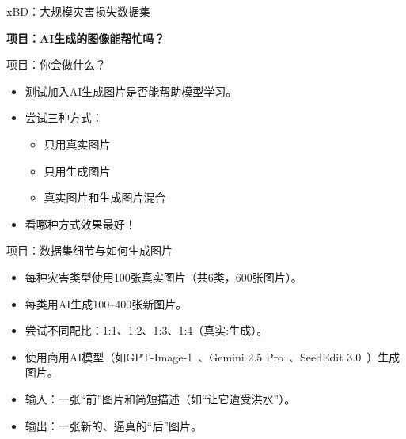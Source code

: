 \begin{refsection}
\begin{frame}{xBD：大规模灾害损失数据集}
\begin{minipage}{0.55\linewidth}
    \end{minipage}
    \bottomleftrefs
  \end{frame}
\end{refsection}

\begin{frame}
  \centering
  \vspace{2.5cm}
  {\LARGE \textbf{项目：AI生成的图像能帮忙吗？}}
\end{frame}

\begin{refsection}
\begin{frame}{项目：你会做什么？}
  \begin{itemize}
    \item 测试加入AI生成图片是否能帮助模型学习。
    \item 尝试三种方式：
      \begin{itemize}
        \item 只用真实图片
        \item 只用生成图片
        \item 真实图片和生成图片混合
      \end{itemize}
    \item 看哪种方式效果最好！
  \end{itemize}
\end{frame}
\end{refsection}

\begin{refsection}
\begin{frame}{项目：数据集细节与如何生成图片}
  \begin{itemize}
    \item 每种灾害类型使用100张真实图片（共6类，600张图片）。
    \item 每类用AI生成100–400张新图片。
    \item 尝试不同配比：1:1、1:2、1:3、1:4（真实:生成）。
    \item 使用商用AI模型（如GPT-Image-1~\parencite{gptimage1}、Gemini 2.5 Pro~\parencite{geminiteamgoogleGemini25Pushing}、SeedEdit 3.0~\parencite{wang2025seedit}）生成图片。
    \item 输入：一张“前”图片和简短描述（如“让它遭受洪水”）。
    \item 输出：一张新的、逼真的“后”图片。
  \end{itemize}
  \bottomleftrefs
\end{frame}
\end{refsection}


